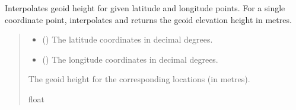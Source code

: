 \documentclass[letterpaper,10pt,english]{sphinxmanual}
\begin{document}
\begin{fulllineitems}
\begin{fulllineitems}
\begin{quote}
\begin{description}
\end{description}\end{quote}

\end{fulllineitems}


\begin{fulllineitems}
\label{\detokenize{modules/earth/geoid:qnav.earth.geoid.GeoidPGM.get_height_vec}}
\pysigstartsignatures
{}
\pysigstopsignatures
\sphinxAtStartPar
Interpolates geoid height for given latitude and longitude points.
For a single coordinate point, interpolates and returns the geoid
elevation height in metres.
\begin{quote}\begin{description}
\begin{itemize}
\item {} 
\sphinxAtStartPar
{} () \textendash{} The latitude coordinates in decimal degrees.

\item {} 
\sphinxAtStartPar
{} () \textendash{} The longitude coordinates in decimal degrees.

\end{itemize}

\sphinxAtStartPar
The geoid height for the corresponding locations (in metres).

\sphinxAtStartPar
float

\end{description}\end{quote}

\end{fulllineitems}



\end{fulllineitems}
\end{document}
